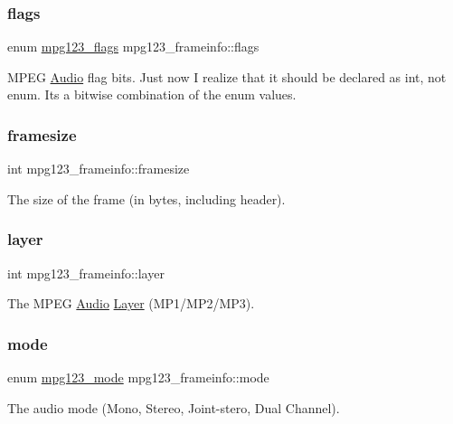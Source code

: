 \subsubsection{\texorpdfstring{flags}{flags}}
{\footnotesize\ttfamily enum \hyperlink{group__mpg123__status_gaf527c5a99203cb8591b0e0dfb2615303}{mpg123\+\_\+flags} mpg123\+\_\+frameinfo\+::flags}

M\+P\+EG \hyperlink{classAudio}{Audio} flag bits. Just now I realize that it should be declared as int, not enum. It\textquotesingle{}s a bitwise combination of the enum values. \mbox{\label{structmpg123__frameinfo_a8846bf9e4d0f9246bf04a4d00254fce9}} 
\subsubsection{\texorpdfstring{framesize}{framesize}}
{\footnotesize\ttfamily int mpg123\+\_\+frameinfo\+::framesize}

The size of the frame (in bytes, including header). \mbox{\label{structmpg123__frameinfo_a23b3cad377729431a601cff6dd227ee2}} 
\subsubsection{\texorpdfstring{layer}{layer}}
{\footnotesize\ttfamily int mpg123\+\_\+frameinfo\+::layer}

The M\+P\+EG \hyperlink{classAudio}{Audio} \hyperlink{classLayer}{Layer} (M\+P1/\+M\+P2/\+M\+P3). \mbox{\label{structmpg123__frameinfo_a2d4adb8ca9bd6dc0de36c8dca3fe531d}} 
\subsubsection{\texorpdfstring{mode}{mode}}
{\footnotesize\ttfamily enum \hyperlink{group__mpg123__status_ga044931724a9a987a86c2eea02f85cc4b}{mpg123\+\_\+mode} mpg123\+\_\+frameinfo\+::mode}

The audio mode (Mono, Stereo, Joint-\/stero, Dual Channel). \mbox{\label{structmpg123__frameinfo_ad9c559387cf061d05384b4c204cd0e97}} 
